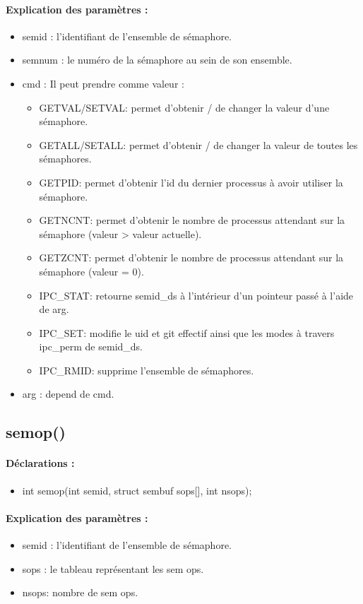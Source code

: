 \documentclass{article}[12pt]
\begin{document}
\paragraph{Explication des paramètres : }
\begin{itemize}
\item semid : l'identifiant de l'ensemble de sémaphore.
\item semnum : le numéro de la sémaphore au sein de son ensemble.
\item cmd : Il peut prendre comme valeur :  
\begin{itemize}
	\item GETVAL/SETVAL: permet d'obtenir / de changer la valeur d'une sémaphore.
	\item GETALL/SETALL: permet d'obtenir / de changer la valeur de toutes les sémaphores.
	\item GETPID: permet d'obtenir l'id du dernier processus à avoir utiliser la sémaphore.
	\item GETNCNT: permet d'obtenir le nombre de processus attendant sur la sémaphore (valeur > valeur actuelle).
	\item GETZCNT: permet d'obtenir le nombre de processus attendant sur la sémaphore (valeur = 0).
	\item IPC\_STAT: retourne semid\_ds à l'intérieur d'un pointeur passé à l'aide de arg.
	\item IPC\_SET: modifie le uid et git effectif ainsi que les modes à travers ipc\_perm de  semid\_ds.
	\item IPC\_RMID: supprime l'ensemble de sémaphores.
\end{itemize}
\item arg :  depend de cmd. 
\end{itemize}
\subsection{semop()}
\paragraph{Déclarations : }
\begin{itemize}
	\item int semop(int semid, struct sembuf sops[], int nsops);
\end{itemize}
\paragraph{Explication des paramètres : }
\begin{itemize}
\item semid : l'identifiant de l'ensemble de sémaphore.
\item sops : le tableau représentant les sem ops. 
\item nsops: nombre de sem ops. 
\end{itemize}
\end{document}
